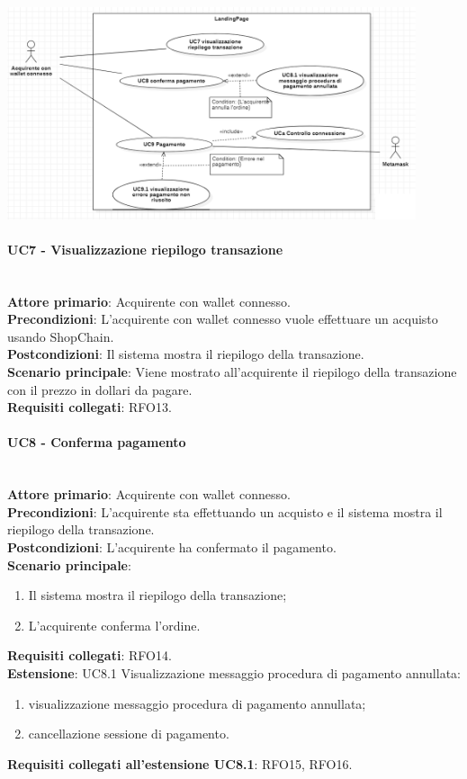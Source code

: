 \documentclass[a4paper, 12pt]{article}
\begin{document}
\includegraphics[width=0.9\textwidth]{UC_LP2}

\paragraph{UC7 - Visualizzazione riepilogo transazione}\\
\textbf{Attore primario}: Acquirente con wallet connesso.\\
\textbf{Precondizioni}: L'acquirente con wallet connesso vuole effettuare un acquisto usando ShopChain.\\
\textbf{Postcondizioni}: Il sistema mostra il riepilogo della transazione.\\
\textbf{Scenario principale}:
Viene mostrato all'acquirente il riepilogo della transazione con il prezzo in dollari da pagare.\\
\textbf{Requisiti collegati}: RFO13.

\paragraph{UC8 - Conferma pagamento}\\
\textbf{Attore primario}: Acquirente con wallet connesso.\\
\textbf{Precondizioni}: L'acquirente sta effettuando un acquisto e il sistema mostra il riepilogo della transazione.\\
\textbf{Postcondizioni}: L'acquirente ha confermato il pagamento.\\
\textbf{Scenario principale}:
\begin{enumerate}
    \item Il sistema mostra il riepilogo della transazione;
    \item L'acquirente conferma l'ordine.
\end{enumerate}
\textbf{Requisiti collegati}: RFO14.\\
\textbf{Estensione}:
UC8.1 Visualizzazione messaggio procedura di pagamento annullata:
\begin{enumerate}
    \item visualizzazione messaggio procedura di pagamento annullata;
    \item cancellazione sessione di pagamento.
\end{enumerate}
\textbf{Requisiti collegati all'estensione UC8.1}: RFO15, RFO16.
\end{document}
